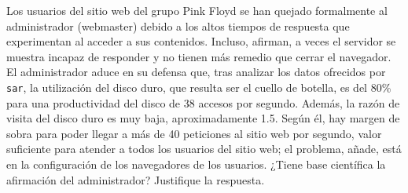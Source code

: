 \begin{ejercicio}\label{ej:5.21}
    Los usuarios del sitio web del grupo Pink Floyd se han quejado formalmente al administrador (webmaster) debido a los altos tiempos de respuesta que experimentan al acceder a sus contenidos. Incluso, afirman, a veces el servidor se muestra incapaz de responder y no tienen más remedio que cerrar el navegador. El administrador aduce en su defensa que, tras analizar los datos ofrecidos por \verb|sar|, la utilización del disco duro, que resulta ser el cuello de botella, es del 80\% para una productividad del disco de 38 accesos por segundo. Además, la razón de visita del disco duro es muy baja, aproximadamente 1.5. Según él, hay margen de sobra para poder llegar a más de 40 peticiones al sitio web por segundo, valor suficiente para atender a todos los usuarios del sitio web; el problema, añade, está en la configuración de los navegadores de los usuarios. ¿Tiene base científica la afirmación del administrador? Justifique la respuesta.
\end{ejercicio}
\begin{comment}
\solucion
    El administrador no tiene razón porque la productividad máxima que soporta el sitio web es de 31.7 peticiones por segundo.
\end{comment}

